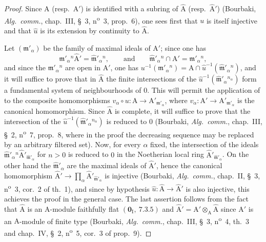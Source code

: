 \begin{proof}
Since $\mathrm{A}$ (resp.\ $\mathrm{A}'$) is identified with a subring of $\hat{\mathrm{A}}$ (resp.\ $\hat{\mathrm{A}}'$) (Bourbaki,
\emph{Alg.\ comm.}, chap.~III, \S~3, n\textsuperscript{o}~3, prop.~6), one sees first that $u$ is itself injective
and that $\hat{u}$ is its extension by continuity to $\hat{\mathrm{A}}$.

Let $(\mathfrak{m}'_\alpha)$ be the family of maximal ideals of $\mathrm{A}'$; since one has
\[
\mathfrak{m}'_\alpha{}^n\hat{\mathrm{A}}'=\hat{\mathfrak{m}}'_\alpha{}^n, \qquad \text{and} \qquad \hat{\mathfrak{m}}'_\alpha{}^n\cap\mathrm{A}'=\mathfrak{m}'_\alpha{}^n,
\]
and since the $\mathfrak{m}'_\alpha{}^n$ are open in $\mathrm{A}'$, one has
$u^{-1}(\mathfrak{m}'_\alpha{}^n)=\mathrm{A}\cap\hat{u}^{-1}(\hat{\mathfrak{m}}'_\alpha{}^n)$, and it will suffice to prove that in
$\hat{\mathrm{A}}$ the finite intersections of the $\hat{u}^{-1}(\hat{\mathfrak{m}}'_\alpha{}^{n_\alpha})$ form a fundamental system of neighbourhoods
of $0$. This will permit the application of  to the composite homomorphisms
$v_\alpha\circ u:\mathrm{A}\to\mathrm{A}'_{\mathfrak{m}'_\alpha}$, where
$v_\alpha:\mathrm{A}'\to\mathrm{A}'_{\mathfrak{m}'_\alpha}$ is the canonical homomorphism. Since $\hat{\mathrm{A}}$ is complete, it will suffice to
prove that the intersection of the $\hat{u}^{-1}(\hat{\mathfrak{m}}'_\alpha{}^{n_\alpha})$ is reduced to $0$ (Bourbaki,
\emph{Alg.\ comm.}, chap.~III, \S~2, n\textsuperscript{o}~7, prop.~8, where in the proof the decreasing sequence may be replaced by an arbitrary
filtered set). Now, for every $\alpha$
fixed, the intersection of the ideals $\hat{\mathfrak{m}}'_\alpha{}^n\hat{\mathrm{A}}'_{\hat{\mathfrak{m}}'_\alpha}$ for $n>0$ is reduced to $0$ in the
Noetherian local ring $\hat{\mathrm{A}}'_{\hat{\mathfrak{m}}'_\alpha}$.
On the other hand the $\hat{\mathfrak{m}}'_\alpha$ are the maximal ideals of $\hat{\mathrm{A}}'$, hence the canonical homomorphism
$\hat{\mathrm{A}}'\to\prod_\alpha\hat{\mathrm{A}}'_{\hat{\mathfrak{m}}'_\alpha}$ is injective (Bourbaki, \emph{Alg.\ comm.}, chap.~II, \S~3, n\textsuperscript{o}~3, cor.~2 of th.~1), and
since by hypothesis $\hat{u}:\hat{\mathrm{A}}\to\hat{\mathrm{A}}'$ is also injective, this achieves the proof in
the general case. The last assertion follows from the fact that $\hat{\mathrm{A}}$ is an $\mathrm{A}$-module faithfully
flat $(\mathbf{0}_\mathrm{I},~7.3.5)$ and $\hat{\mathrm{A}}'=\mathrm{A}'\otimes_\mathrm{A}\hat{\mathrm{A}}$ since $\mathrm{A}'$ is an $\mathrm{A}$-module of finite type
(Bourbaki, \emph{Alg.\ comm.}, chap.~III, \S~3, n\textsuperscript{o}~4, th.~3 and chap.~IV, \S~2, n\textsuperscript{o}~5, cor.~3 of prop.~9).
\end{proof}

